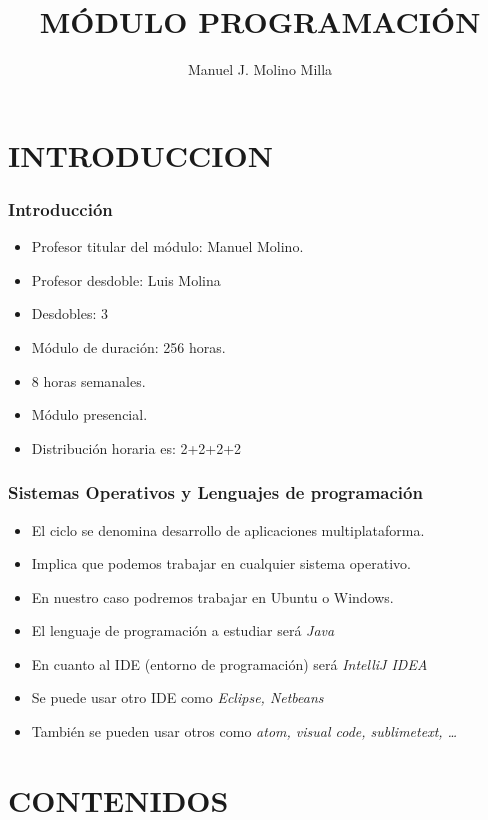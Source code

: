 \documentclass{beamer}
\title{MÓDULO PROGRAMACIÓN}
\author{Manuel J. Molino Milla}
\institute{IES Virgen del Carmen \and Departamento de Informática}
\begin{document}
\begin{frame}
  \titlepage
\end{frame}





\section{INTRODUCCION}


\begin{frame}
\frametitle{Introducción}


\begin{itemize}[<+-| alert@+>]
\item Profesor titular del módulo: Manuel Molino.
\item Profesor desdoble: Luis Molina
\item Desdobles: 3
\item Módulo de duración: 256 horas.
\item 8 horas semanales.
\item Módulo presencial.
\item Distribución horaria es: 2+2+2+2
\end{itemize}
\pause

\end{frame}

\begin{frame}
\frametitle{Sistemas Operativos y Lenguajes de programación}
\begin{itemize}[<+-| alert@+>]
\item El ciclo se denomina desarrollo de aplicaciones multiplataforma.
\item Implica que podemos trabajar en cualquier sistema operativo.
\item En nuestro caso podremos trabajar en Ubuntu o Windows.
\item El lenguaje de programación a estudiar será \emph{Java}
\item En cuanto al IDE (entorno de programación) será \emph{IntelliJ IDEA}
\item Se puede usar otro IDE como \emph{Eclipse, Netbeans}
\item También se pueden usar otros como \emph{atom, visual code, sublimetext, \dots}
\end{itemize}
\pause
\end{frame}

\section{CONTENIDOS}
\end{document}
